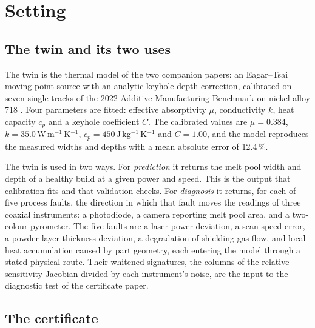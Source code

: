 \documentclass[preprint,12pt]{elsarticle}
\begin{document}
\section{Setting}
\label{sec:setting}

\subsection{The twin and its two uses}
\label{sec:twin}

The twin is the thermal model of the two companion papers: an Eagar--Tsai
moving point source with an analytic keyhole depth correction, calibrated on
seven single tracks of the 2022 Additive Manufacturing Benchmark on nickel alloy
718 \cite{Weaver2024}. Four parameters are fitted: effective absorptivity
$\mu$, conductivity $k$, heat capacity $c_p$ and a keyhole coefficient $C$.
The calibrated values are $\mu = 0.384$, $k = 35.0$\,W\,m$^{-1}$\,K$^{-1}$,
$c_p = 450$\,J\,kg$^{-1}$\,K$^{-1}$ and $C = 1.00$, and the model reproduces the
measured widths and depths with a mean absolute error of 12.4\,\%.

The twin is used in two ways. For \emph{prediction} it returns the melt pool
width and depth of a healthy build at a given power and speed. This is the
output that calibration fits and that validation checks. For \emph{diagnosis}
it returns, for each of five process faults, the direction in which that fault
moves the readings of three coaxial instruments: a photodiode, a camera
reporting melt pool area, and a two-colour pyrometer. The five faults are a
laser power deviation, a scan speed error, a powder layer thickness deviation, a
degradation of shielding gas flow, and local heat accumulation caused by part
geometry, each entering the model through a stated physical route. Their
whitened signatures, the columns of the relative-sensitivity Jacobian divided by
each instrument's noise, are the input to the diagnostic test of the
certificate paper.

\subsection{The certificate}
\label{sec:certificate}
\end{document}
